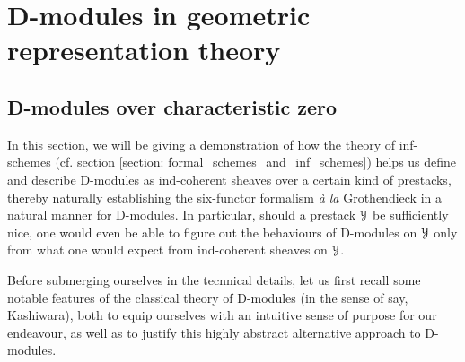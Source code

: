 \chapter{D-modules in geometric representation theory}
    \begin{abstract}
        
    \end{abstract}
    
    \minitoc
    
    \section{D-modules over characteristic zero}
        In this section, we will be giving a demonstration of how the theory of inf-schemes (cf. section \ref{section: formal_schemes_and_inf_schemes}) helps us define and describe D-modules as ind-coherent sheaves over a certain kind of prestacks, thereby naturally establishing the six-functor formalism \textit{\`a la} Grothendieck in a natural manner for D-modules. In particular, should a prestack $\mathcal{Y}$ be sufficiently nice, one would even be able to figure out the behaviours of D-modules on $\mathcal{Y}$ only from what one would expect from ind-coherent sheaves on $\mathcal{Y}$. 
        
        Before submerging ourselves in the tecnnical details, let us first recall some notable features of the classical theory of D-modules (in the sense of say, Kashiwara), both to equip ourselves with an intuitive sense of purpose for our endeavour, as well as to justify this highly abstract alternative approach to D-modules. 
        
